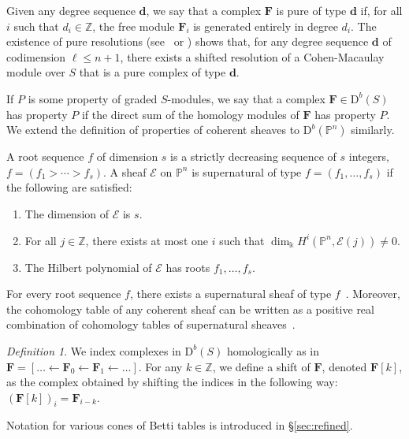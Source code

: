 \documentclass[12pt]{amsart}
\theoremstyle{definition}
\theoremstyle{remark}
\newtheorem{defn}[lemma]{Definition}
\newcommand{\PP}{\mathbb{P}}
\newcommand{\ZZ}{\mathbb{Z}}
\newcommand{\dd}{\mathbf{d}}
\newcommand{\cE}{\mathcal{E}}
\newcommand{\FF}{\mathbf{F}}
\newcommand{\defi}[1]{\textsf{#1}} %
\newcommand{\DD}{\mathrm{D}}
\begin{document}
Given any degree sequence $\dd$, we say that a complex $\FF$ is \defi{pure of type $\dd$} if, for all $i$ such that $d_i\in \ZZ$, the free module $\FF_i$ is generated entirely in degree $d_i$.   The existence of pure resolutions (see~\cite{efw} or \cite[\S5]{eis-schrey1}) shows that, for any  degree sequence $\dd$ of codimension $\ell\leq n+1$, there exists a shifted resolution of a Cohen-Macaulay module over $S$ that is a pure complex of type $\dd$.  

If $P$ is some property of graded $S$-modules, we say that a complex $\FF \in \DD^b(S)$ has property $P$ if the direct sum of the homology modules of $\FF$ has property $P$. We extend the definition of  properties of coherent sheaves to $\DD^b(\PP^n)$ similarly.  

A \defi{root sequence $f$ of dimension $s$} is a strictly decreasing sequence
of $s$ integers, $f=(f_1>\cdots>f_s)$.  
A sheaf $\cE$ on $\PP^{n}$ is
\defi{supernatural of type} $f=(f_1, \dots, f_{s})$ if the following are satisfied: 
\begin{enumerate}
\item The dimension of $\cE$ is $s$.
\item For all $j\in \mathbb Z$, there exists at most one $i$ 
		such that $\dim_\Bbbk H^i(\PP^{n}, \cE(j))\ne 0$.
\item The Hilbert polynomial of $\cE$ has roots $f_1, \dots, f_{s}$.
\end{enumerate}
For every root sequence $f$, there exists a supernatural sheaf of type
$f$~\cite[Theorem~0.4]{eis-schrey1}.
Moreover, the cohomology table of any coherent sheaf 
can be written as a positive real combination of cohomology tables 
of supernatural sheaves~\cite[Theorem~0.1]{eis-schrey1}.  



\begin{defn}
We index complexes in $\DD^b(S)$ homologically as in $\FF=[\dots \gets \FF_0\gets \FF_1\gets \dots]$.  For any $k\in \ZZ$, we define a \defi{shift} of $\FF$, denoted $\FF[k]$, as the complex obtained by shifting the indices in the following way:  $(\FF[k])_i=\FF_{i-k}$.
\end{defn}

Notation for various cones of Betti tables is introduced in \S\ref{sec:refined}.
\end{document}
